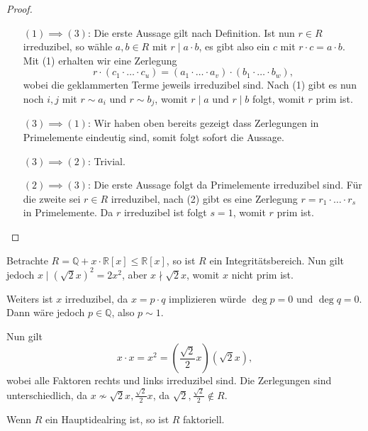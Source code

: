 \begin{proof}{\ }
    \begin{itemize}[leftmargin=2.5cm]
        \item[$(1) \implies (3)$:] Die erste Aussage gilt nach Definition. Ist nun $r \in R$ irreduzibel, so wähle $a, b \in R$ mit $r \mid a \cdot b$, es gibt also ein $c$ mit $r \cdot c = a \cdot b$. Mit (1) erhalten wir eine Zerlegung
        $$ r \cdot (c_1 \cdot \hdots \cdot c_u) = (a_1 \cdot \hdots \cdot a_v) \cdot (b_1 \cdot \hdots \cdot b_w), $$
        wobei die geklammerten Terme jeweils irreduzibel sind. Nach (1) gibt es nun noch $i, j$ mit $r \sim a_i$ und $r \sim b_j$, womit $r \mid a$ und $r \mid b$ folgt, womit $r$ prim ist.

        \item[$(3) \implies (1)$:] Wir haben oben bereits gezeigt dass Zerlegungen in Primelemente eindeutig sind, somit folgt sofort die Aussage.
        
        \item[$(3) \implies (2)$:] Trivial.

        \item[$(2) \implies (3)$:] Die erste Aussage folgt da Primelemente irreduzibel sind. Für die zweite sei $r \in R$ irreduzibel, nach (2) gibt es eine Zerlegung $r = r_1 \cdot \hdots \cdot r_s$ in Primelemente. Da $r$ irreduzibel ist folgt $s = 1$, womit $r$ prim ist.
    \end{itemize}
\end{proof}

\begin{example}
    Betrachte $R = \mathbb{Q} + x \cdot \mathbb{R}[x] \leq \mathbb{R}[x]$, so ist $R$ ein Integritätsbereich. Nun gilt jedoch $x \mid (\sqrt{2} x)^2 = 2x^2$, aber $x \nmid \sqrt{2}x$, womit $x$ nicht prim ist.
    
    Weiters ist $x$ irreduzibel, da $x = p \cdot q$ implizieren würde $\deg{p} = 0$ und $\deg{q} = 0$. Dann wäre jedoch $p \in \mathbb{Q}$, also $p \sim 1$.
    
    Nun gilt
    $$ x \cdot x = x^2 = (\frac{\sqrt{2}}{2} x)(\sqrt{2}x), $$
    wobei alle Faktoren rechts und links irreduzibel sind. Die Zerlegungen sind unterschiedlich, da $x \not\sim \sqrt{2} x, \frac{\sqrt{2}}{2} x$, da $\sqrt{2}, \frac{\sqrt{2}}{2} \notin R$.
\end{example}

\begin{proposition}
    Wenn $R$ ein Hauptidealring ist, so ist $R$ faktoriell.
\end{proposition}

